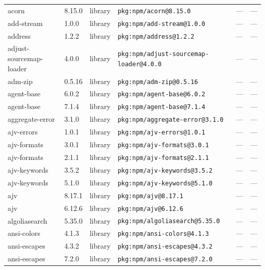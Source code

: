 \documentclass[11pt,a4paper]{article}
\begin{document}
\begin{longtable}{|p{4cm}|p{2cm}|p{1.6cm}|p{5cm}|p{1.5cm}|p{3.5cm}|}
\raggedright acorn & 8.15.0 & library & \small\texttt{pkg:npm/acorn@8.15.0} & — & \small — \\
\raggedright add-stream & 1.0.0 & library & \small\texttt{pkg:npm/add-stream@1.0.0} & — & \small — \\
\raggedright address & 1.2.2 & library & \small\texttt{pkg:npm/address@1.2.2} & — & \small — \\
\raggedright adjust-sourcemap-loader & 4.0.0 & library & \small\texttt{pkg:npm/adjust-sourcemap-loader@4.0.0} & — & \small — \\
\raggedright adm-zip & 0.5.16 & library & \small\texttt{pkg:npm/adm-zip@0.5.16} & — & \small — \\
\raggedright agent-base & 6.0.2 & library & \small\texttt{pkg:npm/agent-base@6.0.2} & — & \small — \\
\raggedright agent-base & 7.1.4 & library & \small\texttt{pkg:npm/agent-base@7.1.4} & — & \small — \\
\raggedright aggregate-error & 3.1.0 & library & \small\texttt{pkg:npm/aggregate-error@3.1.0} & — & \small — \\
\raggedright ajv-errors & 1.0.1 & library & \small\texttt{pkg:npm/ajv-errors@1.0.1} & — & \small — \\
\raggedright ajv-formats & 3.0.1 & library & \small\texttt{pkg:npm/ajv-formats@3.0.1} & — & \small — \\
\raggedright ajv-formats & 2.1.1 & library & \small\texttt{pkg:npm/ajv-formats@2.1.1} & — & \small — \\
\raggedright ajv-keywords & 3.5.2 & library & \small\texttt{pkg:npm/ajv-keywords@3.5.2} & — & \small — \\
\raggedright ajv-keywords & 5.1.0 & library & \small\texttt{pkg:npm/ajv-keywords@5.1.0} & — & \small — \\
\raggedright ajv & 8.17.1 & library & \small\texttt{pkg:npm/ajv@8.17.1} & — & \small — \\
\raggedright ajv & 6.12.6 & library & \small\texttt{pkg:npm/ajv@6.12.6} & — & \small — \\
\raggedright algoliasearch & 5.35.0 & library & \small\texttt{pkg:npm/algoliasearch@5.35.0} & — & \small — \\
\raggedright ansi-colors & 4.1.3 & library & \small\texttt{pkg:npm/ansi-colors@4.1.3} & — & \small — \\
\raggedright ansi-escapes & 4.3.2 & library & \small\texttt{pkg:npm/ansi-escapes@4.3.2} & — & \small — \\
\raggedright ansi-escapes & 7.2.0 & library & \small\texttt{pkg:npm/ansi-escapes@7.2.0} & — & \small — \\

\end{longtable}
\end{document}
